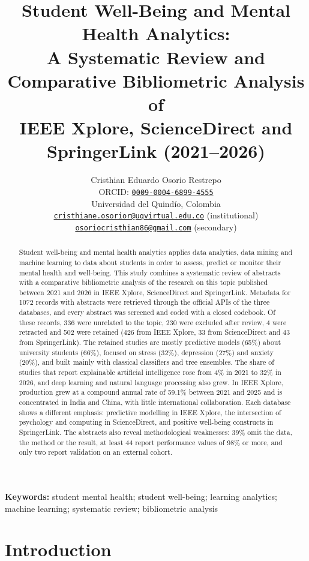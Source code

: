 \documentclass[11pt,a4paper]{article}
\title{Student Well-Being and Mental Health Analytics:\\
A Systematic Review and Comparative Bibliometric Analysis of\\
IEEE Xplore, ScienceDirect and SpringerLink (2021--2026)}
\author{Cristhian Eduardo Osorio Restrepo\\[2pt]
\small ORCID: \href{https://orcid.org/0009-0004-6899-4555}{\texttt{0009-0004-6899-4555}}\\
\small Universidad del Quindío, Colombia\\
\small \href{mailto:cristhiane.osorior@uqvirtual.edu.co}{\texttt{cristhiane.osorior@uqvirtual.edu.co}} (institutional)\\
\small \href{mailto:osoriocristhian86@gmail.com}{\texttt{osoriocristhian86@gmail.com}} (secondary)}
\date{}
\begin{document}
\maketitle

\begin{abstract}
Student well-being and mental health analytics applies data analytics, data mining and machine learning to data about students in order to assess, predict or monitor their mental health and well-being. This study combines a systematic review of abstracts with a comparative bibliometric analysis of the research on this topic published between 2021 and 2026 in IEEE Xplore, ScienceDirect and SpringerLink. Metadata for 1072 records with abstracts were retrieved through the official APIs of the three databases, and every abstract was screened and coded with a closed codebook. Of these records, 336 were unrelated to the topic, 230 were excluded after review, 4 were retracted and 502 were retained (426 from IEEE Xplore, 33 from ScienceDirect and 43 from SpringerLink). The retained studies are mostly predictive models (65\%) about university students (66\%), focused on stress (32\%), depression (27\%) and anxiety (20\%), and built mainly with classical classifiers and tree ensembles. The share of studies that report explainable artificial intelligence rose from 4\% in 2021 to 32\% in 2026, and deep learning and natural language processing also grew. In IEEE Xplore, production grew at a compound annual rate of 59.1\% between 2021 and 2025 and is concentrated in India and China, with little international collaboration. Each database shows a different emphasis: predictive modelling in IEEE Xplore, the intersection of psychology and computing in ScienceDirect, and positive well-being constructs in SpringerLink. The abstracts also reveal methodological weaknesses: 39\% omit the data, the method or the result, at least 44 report performance values of 98\% or more, and only two report validation on an external cohort.
\end{abstract}

\noindent\textbf{Keywords:} student mental health; student well-being; learning analytics; machine learning; systematic review; bibliometric analysis

\section{Introduction}
\end{document}
